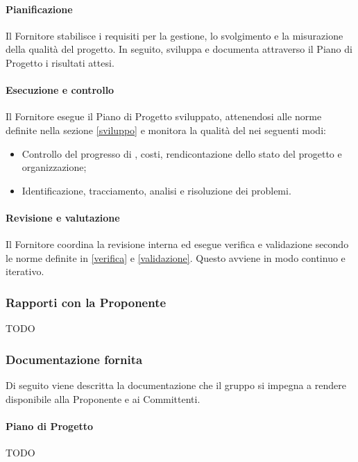 \paragraph{Pianificazione}
Il Fornitore stabilisce i requisiti per la gestione, lo svolgimento e la misurazione della qualità del progetto. In seguito, sviluppa e documenta attraverso il Piano di Progetto i risultati attesi.

\paragraph{Esecuzione e controllo}
Il Fornitore esegue il Piano di Progetto sviluppato, attenendosi alle norme definite nella sezione \ref{sviluppo} e monitora la qualità del  nei seguenti modi:
\begin{itemize}
  \item Controllo del progresso di , costi, rendicontazione dello stato del progetto e organizzazione;
  \item Identificazione, tracciamento, analisi e risoluzione dei problemi.
\end{itemize}

\paragraph{Revisione e valutazione}
Il Fornitore coordina la revisione interna ed esegue verifica e validazione secondo le norme definite in \ref{verifica} e \ref{validazione}. Questo avviene in modo continuo e iterativo.



\subsubsection{Rapporti con la Proponente}
TODO

\subsubsection{Documentazione fornita}\label{documentazionefornita}
Di seguito viene descritta la documentazione che il gruppo si impegna a rendere disponibile alla Proponente e ai Committenti.

\paragraph{Piano di Progetto}
TODO

